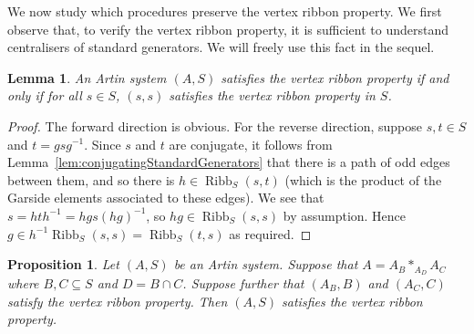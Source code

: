 \documentclass[svgnames]{amsart}
\theoremstyle{plain}
\newtheorem{lemma}[thm]{Lemma}
\newtheorem{prop}[thm]{Proposition}
\theoremstyle{definition}
\newcommand{\ribb}[3]{\operatorname{Ribb}_{#1}(#2,#3)}
\begin{document}
We now study which procedures preserve the vertex ribbon property. We first observe that, to verify the vertex ribbon property, it is sufficient to understand centralisers of standard generators. We will freely use this fact in the sequel.

\begin{lemma}\label{lem:ss_rib_implies_st_rib}
   An Artin system $(A,S)$ satisfies the vertex ribbon property if and only if for all $s \in S$, $(s,s)$ satisfies the vertex ribbon property in $S$.
\end{lemma}
\begin{proof}
    The forward direction is obvious. For the reverse direction, suppose $s, t \in S$ and $t = gsg^{-1}$. Since $s$ and $t$ are conjugate, it follows from Lemma~\ref{lem:conjugatingStandardGenerators} that there is a path of odd edges between them, and so there is $h \in \ribb{S}{s}{t}$ (which is the product of the Garside elements associated to these edges). We see that $s = hth^{-1} = hgs(hg)^{-1}$, so $hg \in \ribb{S}{s}{s}$ by assumption. Hence $g \in h^{-1}\ribb{S}{s}{s} = \ribb{S}{t}{s}$ as required.
\end{proof}

\begin{prop}\label{prop:combination_ribbons}
    Let $(A,S)$ be an Artin system. Suppose that $A = A_B *_{A_D} A_C$ where $B,C \subseteq S$ and $D=B\cap C$. Suppose further that $(A_B,B)$ and $(A_C,C)$ satisfy the vertex ribbon property. Then $(A,S)$ satisfies the vertex ribbon property.
\end{prop}
\end{document}
